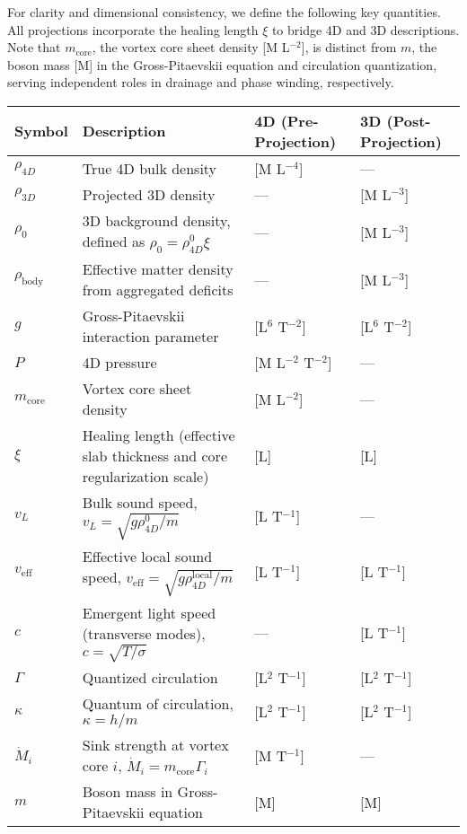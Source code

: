 For clarity and dimensional consistency, we define the following key quantities. All projections incorporate the healing length $\xi$ to bridge 4D and 3D descriptions. Note that $m_{\text{core}}$, the vortex core sheet density [M L$^{-2}$], is distinct from $m$, the boson mass [M] in the Gross-Pitaevskii equation and circulation quantization, serving independent roles in drainage and phase winding, respectively.

\begin{table}[H]
\centering
\begin{tabular}{|l|l|l|l|}
\hline
Symbol & Description & 4D (Pre-Projection) & 3D (Post-Projection) \\
\hline
$\rho_{4D}$ & True 4D bulk density & [M L$^{-4}$] & --- \\
\hline
$\rho_{3D}$ & Projected 3D density & --- & [M L$^{-3}$] \\
\hline
$\rho_0$ & 3D background density, defined as $\rho_0 = \rho_{4D}^0 \xi$ & --- & [M L$^{-3}$] \\
\hline
$\rho_{\text{body}}$ & Effective matter density from aggregated deficits & --- & [M L$^{-3}$] \\
\hline
$g$ & Gross-Pitaevskii interaction parameter & [L$^6$ T$^{-2}$] & [L$^6$ T$^{-2}$] \\
\hline
$P$ & 4D pressure & [M L$^{-2}$ T$^{-2}$] & --- \\
\hline
$m_{\text{core}}$ & Vortex core sheet density & [M L$^{-2}$] & --- \\
\hline
$\xi$ & Healing length (effective slab thickness and core regularization scale) & [L] & [L] \\
\hline
$v_L$ & Bulk sound speed, $v_L = \sqrt{g \rho_{4D}^0 / m}$ & [L T$^{-1}$] & --- \\
\hline
$v_{\text{eff}}$ & Effective local sound speed, $v_{\text{eff}} = \sqrt{g \rho_{4D}^{\text{local}} / m}$ & [L T$^{-1}$] & [L T$^{-1}$] \\
\hline
$c$ & Emergent light speed (transverse modes), $c = \sqrt{T / \sigma}$ & --- & [L T$^{-1}$] \\
\hline
$\Gamma$ & Quantized circulation & [L$^2$ T$^{-1}$] & [L$^2$ T$^{-1}$] \\
\hline
$\kappa$ & Quantum of circulation, $\kappa = h / m$ & [L$^2$ T$^{-1}$] & [L$^2$ T$^{-1}$] \\
\hline
$\dot{M}_i$ & Sink strength at vortex core $i$, $\dot{M}_i = m_{\text{core}} \Gamma_i$ & [M T$^{-1}$] & --- \\
\hline
$m$ & Boson mass in Gross-Pitaevskii equation & [M] & [M] \\

\end{tabular}
\end{table}
